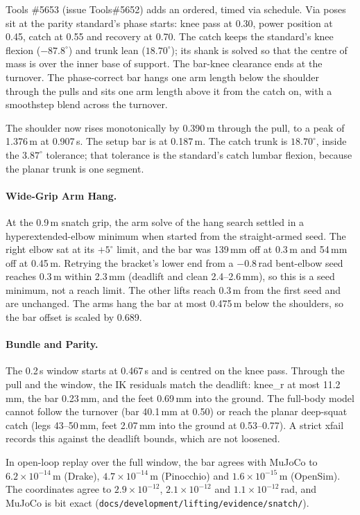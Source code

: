 \documentclass[11pt,a4paper]{article}
\begin{document}
Tools \#5653 (issue Tools\#5652) adds an ordered, timed via schedule. Via
poses sit at the parity standard's phase starts: knee pass at 0.30, power
position at 0.45, catch at 0.55 and recovery at 0.70. The catch keeps the
standard's knee flexion ($-87.8^\circ$) and trunk lean ($18.70^\circ$); its
shank is solved so that the centre of mass is over the inner base of
support. The bar-knee clearance ends at the turnover. The phase-correct bar
hangs one arm length below the shoulder through the pulls and sits one arm
length above it from the catch on, with a smoothstep blend across the
turnover.

The shoulder now rises monotonically by 0.390\,m through the pull, to a peak
of 1.376\,m at 0.907\,s. The setup bar is at 0.187\,m. The catch trunk is
$18.70^\circ$, inside the $3.87^\circ$ tolerance; that tolerance is the
standard's catch lumbar flexion, because the planar trunk is one segment.

\paragraph{Wide-Grip Arm Hang.} At the 0.9\,m snatch grip, the arm solve of
the hang search settled in a hyperextended-elbow minimum when started from
the straight-armed seed. The right elbow sat at its $+5^\circ$ limit, and
the bar was 139\,mm off at 0.3\,m and 54\,mm off at 0.45\,m. Retrying the
bracket's lower end from a $-0.8$\,rad bent-elbow seed reaches 0.3\,m within
2.3\,mm (deadlift and clean 2.4--2.6\,mm), so this is a seed minimum, not a
reach limit. The other lifts reach 0.3\,m from the first seed and are
unchanged. The arms hang the bar at most 0.475\,m below the shoulders, so
the bar offset is scaled by 0.689.

\paragraph{Bundle and Parity.} The 0.2\,s window starts at 0.467\,s and is
centred on the knee pass. Through the pull and the window, the IK residuals
match the deadlift: knee\_r at most 11.2\,mm, the bar 0.23\,mm, and the
feet 0.69\,mm into the ground. The full-body model cannot follow the turnover
(bar 40.1\,mm at 0.50) or reach the planar deep-squat catch (legs 43--50\,mm,
feet 2.07\,mm into the ground at 0.53--0.77). A strict xfail records this
against the deadlift bounds, which are not loosened.

In open-loop replay over the full window, the bar agrees with MuJoCo to
$6.2\times10^{-14}$\,m (Drake), $4.7\times10^{-14}$\,m (Pinocchio) and
$1.6\times10^{-15}$\,m (OpenSim). The coordinates agree to
$2.9\times10^{-12}$, $2.1\times10^{-12}$ and $1.1\times10^{-12}$\,rad, and
MuJoCo is bit exact (\texttt{docs/development/lifting/evidence/snatch/}).
\end{document}
